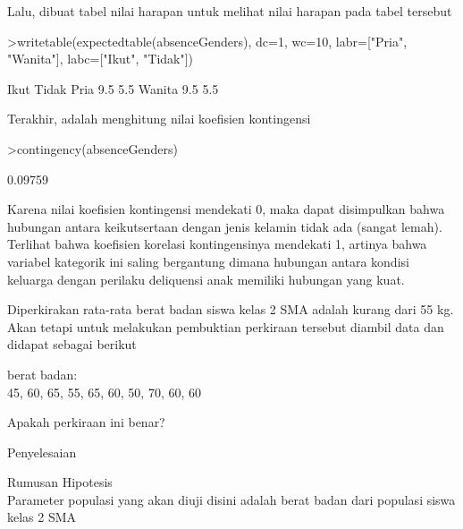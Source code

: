 \documentclass[a4paper,10pt]{article}
\begin{document}
\begin{eulernotebook}
\begin{eulercomment}
\begin{eulercomment}
\begin{eulercomment}
\begin{eulercomment}
\begin{eulercomment}
\begin{eulercomment}
\begin{eulercomment}
Lalu, dibuat tabel nilai harapan untuk melihat nilai harapan pada
tabel tersebut
\end{eulercomment}
\begin{eulerprompt}
>writetable(expectedtable(absenceGenders), dc=1, wc=10, labr=["Pria", "Wanita"], labc=["Ikut", "Tidak"])
\end{eulerprompt}
\begin{euleroutput}
                  Ikut     Tidak
        Pria       9.5       5.5
      Wanita       9.5       5.5
\end{euleroutput}
\begin{eulercomment}
Terakhir, adalah menghitung nilai koefisien kontingensi
\end{eulercomment}
\begin{eulerprompt}
>contingency(absenceGenders)
\end{eulerprompt}
\begin{euleroutput}
  0.09759
\end{euleroutput}
\begin{eulercomment}
Karena nilai koefisien kontingensi mendekati 0, maka dapat disimpulkan
bahwa hubungan antara keikutsertaan dengan jenis kelamin tidak ada
(sangat lemah).
Terlihat bahwa koefisien korelasi kontingensinya mendekati 1, artinya
bahwa variabel kategorik ini saling bergantung dimana hubungan antara
kondisi keluarga dengan perilaku deliquensi anak memiliki hubungan
yang kuat.
\end{eulercomment}
\begin{eulercomment}
Diperkirakan rata-rata berat badan siswa kelas 2 SMA adalah kurang
dari 55 kg. Akan tetapi untuk melakukan pembuktian perkiraan tersebut
diambil data dan didapat sebagai berikut

berat badan:\\
45, 60,  65, 55, 65, 60, 50, 70, 60, 60

Apakah perkiraan ini benar?

Penyelesaian

Rumusan Hipotesis\\
Parameter populasi yang akan diuji disini adalah berat badan dari
populasi siswa kelas 2 SMA


\end{eulercomment}
\end{eulercomment}
\end{eulercomment}
\end{eulercomment}
\end{eulercomment}
\end{eulercomment}
\end{eulercomment}
\end{eulernotebook}
\end{document}

